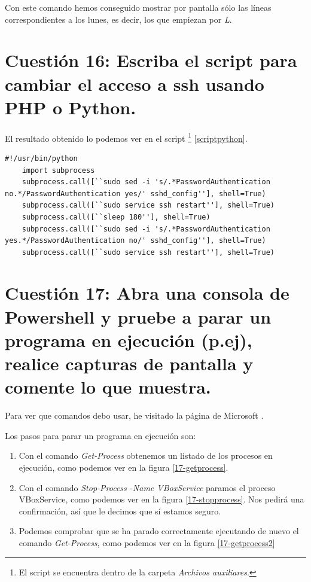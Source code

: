 \documentclass[a4paper,titlepage,12pt]{scrartcl}	%
\numberwithin{figure}{section} %
\numberwithin{table}{section} %
\begin{document}
	Con este comando hemos conseguido mostrar por pantalla sólo las líneas correspondientes a los lunes, es decir, los que empiezan por \textit{L}.
	
	\section[Cuestión 16: Escriba el script para cambiar el acceso a ssh usando PHP o Python.]{Cuestión 16: Escriba el script para cambiar el acceso a ssh usando PHP o Python.}
	
	El resultado obtenido lo podemos ver en el script \footnote{El script se encuentra dentro de la carpeta \textit{Archivos auxiliares}.} \ref{scriptpython}.
	
	\lstset{language=python, xleftmargin=-1cm, breaklines=true, basicstyle=\footnotesize}	
	\begin{lstlisting}[label={scriptpython}]
	#!/usr/bin/python
	import subprocess
	subprocess.call([``sudo sed -i 's/.*PasswordAuthentication no.*/PasswordAuthentication yes/' sshd_config''], shell=True)
	subprocess.call([``sudo service ssh restart''], shell=True)
	subprocess.call([``sleep 180''], shell=True)
	subprocess.call([``sudo sed -i 's/.*PasswordAuthentication yes.*/PasswordAuthentication no/' sshd_config''], shell=True)
	subprocess.call([``sudo service ssh restart''], shell=True)
	\end{lstlisting}
	
	\section[Cuestión 17: Abra una consola de Powershell y pruebe a parar un programa en ejecución (p.ej), realice capturas de pantalla y comente lo que muestra.]{Cuestión 17: Abra una consola de Powershell y pruebe a parar un programa en ejecución (p.ej), realice capturas de pantalla y comente lo que muestra.}
	
	Para ver que comandos debo usar, he visitado la página de Microsoft \cite{ps}.
	
	Los pasos para parar un programa en ejecución son: 
	\begin{enumerate}
		\item Con el comando \textit{Get-Process} obtenemos un listado de los procesos en ejecución, como podemos ver en la figura \ref{17-getprocess}.
		\item Con el comando \textit{Stop-Process -Name VBoxService} paramos el proceso VBoxService, como podemos ver en la figura \ref{17-stopprocess}. Nos pedirá una confirmación, así que le decimos que sí estamos seguro.
		\item Podemos comprobar que se ha parado correctamente ejecutando de nuevo el comando \textit{Get-Process}, como podemos ver en la figura \ref{17-getprocess2}
	\end{enumerate}
	
\end{document}
